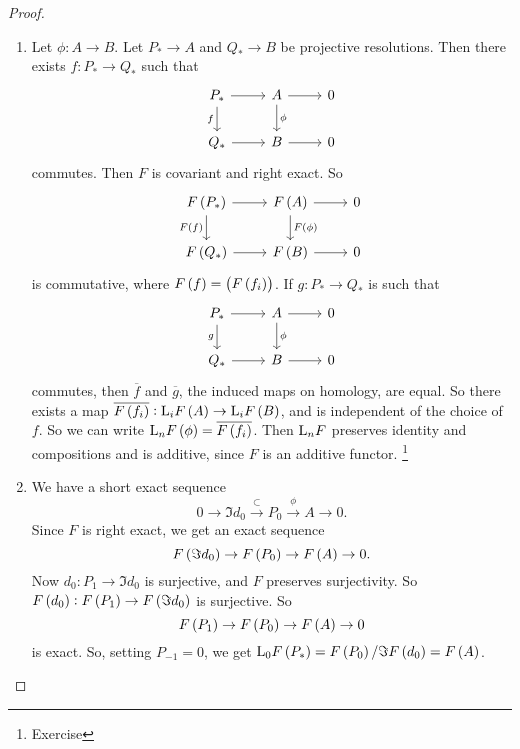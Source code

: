 \begin{proof}
\begin{enumerate}
\item Let $ \phi : A \to B $. Let $ P_* \to A $ and $ Q_* \to B $ be projective resolutions. Then there exists $ f : P_* \to Q_* $ such that
$$
\begin{tikzcd}
P_* \arrow{r} \arrow[swap]{d}{f} & A \arrow{r} \arrow{d}{\phi} & 0 \\
Q_* \arrow{r} & B \arrow{r} & 0
\end{tikzcd}
$$
commutes. Then $ F $ is covariant and right exact. So
$$
\begin{tikzcd}
F\br{P_*} \arrow{r} \arrow[swap]{d}{F\br{f}} & F\br{A} \arrow{r} \arrow{d}{F\br{\phi}} & 0 \\
F\br{Q_*} \arrow{r} & F\br{B} \arrow{r} & 0
\end{tikzcd}
$$
is commutative, where $ F\br{f} = \br{F\br{f_i}} $. If $ g : P_* \to Q_* $ is such that
$$
\begin{tikzcd}
P_* \arrow{r} \arrow[swap]{d}{g} & A \arrow{r} \arrow{d}{\phi} & 0 \\
Q_* \arrow{r} & B \arrow{r} & 0
\end{tikzcd}
$$
commutes, then $ \overline{f} $ and $ \overline{g} $, the induced maps on homology, are equal. So there exists a map $ \overline{F\br{f_i}} : \L_iF\br{A} \to \L_iF\br{B} $, and is independent of the choice of $ f $. So we can write $ \L_nF\br{\phi} = \overline{F\br{f_i}} $. Then $ \mathrm{L}_nF $ preserves identity and compositions and is additive, since $ F $ is an additive functor. \footnote{Exercise}
\item We have a short exact sequence
$$ 0 \to \Im d_0 \xrightarrow{\subset} P_0 \xrightarrow{\phi} A \to 0. $$
Since $ F $ is right exact, we get an exact sequence
$$ F\br{\Im d_0} \to F\br{P_0} \to F\br{A} \to 0. $$
Now $ d_0 : P_1 \to \Im d_0 $ is surjective, and $ F $ preserves surjectivity. So $ F\br{d_0} : F\br{P_1} \to F\br{\Im d_0} $ is surjective. So
$$ F\br{P_1} \to F\br{P_0} \to F\br{A} \to 0 $$
is exact. So, setting $ P_{-1} = 0 $, we get $ \L_0F\br{P_*} = F\br{P_0} / \Im F\br{d_0} = F\br{A} $.
\end{enumerate}
\end{proof}

